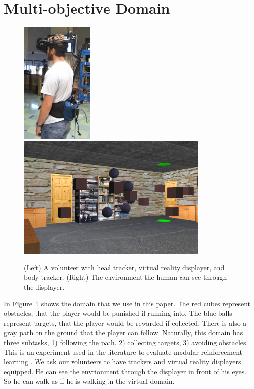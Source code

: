 \documentclass[11pt]{article} %
\begin{document}
\section{Multi-objective Domain}
\label{sec:domain}

\begin{figure}[h!]
\centering
\includegraphics[height=6cm]{human.jpg}
\includegraphics[height=6cm]{env.png}
\caption{(Left) A volunteer with head tracker, virtual reality displayer, and
body tracker.  (Right) The environment the human can see through the displayer.}
\label{fig:avatar}
\end{figure}

In Figure~\ref{fig:avatar} shows the domain that we use in this paper. The red
cubes represent obstacles, that the player would be punished if running
into. The blue balls represent targets, that the player would be rewarded if
collected. There is also a gray path on the ground that the player can follow.
Naturally, this domain has three subtasks, 1) following the path, 2)
collecting targets, 3) avoiding obstacles.
This is an experiment used in the
literature to evaluate modular reinforcement learning
\cite{rothkopf2013modular}.
We ask our volunteers to have trackers and virtual reality displayers equipped. He
can see the envrionment through the displayer in front of his eyes. So he can
walk as if he is walking in the virtual domain.
\end{document}
